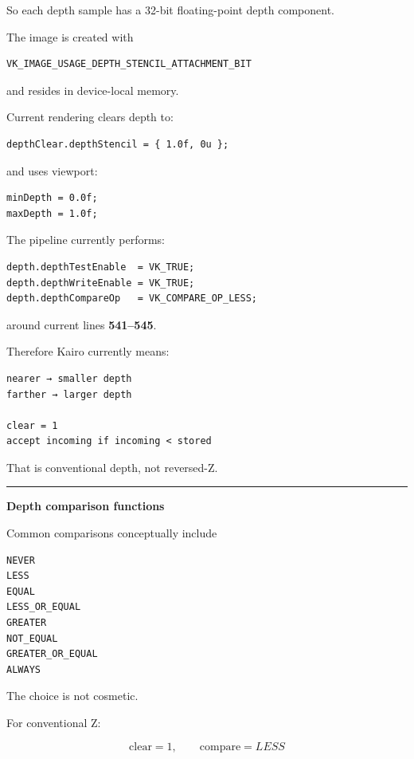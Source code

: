 So each depth sample has a 32-bit floating-point depth component.

The image is created with

\begin{verbatim}
VK_IMAGE_USAGE_DEPTH_STENCIL_ATTACHMENT_BIT
\end{verbatim}

and resides in device-local memory.

Current  rendering clears depth to:

\begin{verbatim}
depthClear.depthStencil = { 1.0f, 0u };
\end{verbatim}

and uses viewport:

\begin{verbatim}
minDepth = 0.0f;
maxDepth = 1.0f;
\end{verbatim}

The pipeline currently performs:

\begin{verbatim}
depth.depthTestEnable  = VK_TRUE;
depth.depthWriteEnable = VK_TRUE;
depth.depthCompareOp   = VK_COMPARE_OP_LESS;
\end{verbatim}

around current lines \textbf{541--545}.

Therefore Kairo currently means:

\begin{verbatim}
nearer → smaller depth
farther → larger depth

clear = 1
accept incoming if incoming < stored
\end{verbatim}

That is conventional depth, not reversed-Z.

\begin{center}\rule{0.5\linewidth}{0.5pt}\end{center}

\textbf{Depth comparison functions}

Common comparisons conceptually include

\begin{verbatim}
NEVER
LESS
EQUAL
LESS_OR_EQUAL
GREATER
NOT_EQUAL
GREATER_OR_EQUAL
ALWAYS
\end{verbatim}

The choice is not cosmetic.

For conventional Z:

\[
\text{clear}=1,\qquad
\text{compare}=LESS
\]

